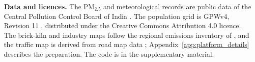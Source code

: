 \noindent\textbf{Data and licences.}
The PM\(_{2.5}\) and meteorological records are public data of the Central Pollution
Control Board of India \citep{cpcb,cpcb_portal}.  The population grid is GPWv4,
Revision 11 \citep{ColumbiaUniversity2018}, distributed under the Creative Commons
Attribution 4.0 licence.  The brick-kiln and industry maps follow the regional
emissions inventory of \citet{GUTTIKUNDA2013101}, and the traffic map is derived from
road map data \citep{google_maps}; Appendix~\ref{app:platform_details} describes the
preparation.  The code is in the supplementary material.
